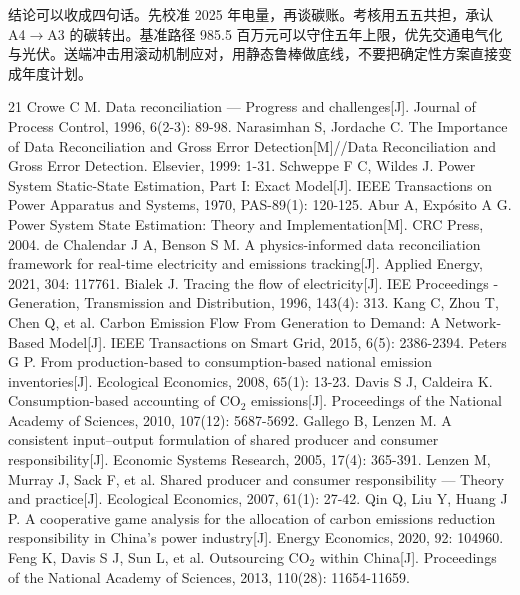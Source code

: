 \documentclass[UTF8,a4paper,zihao=-4,fontset=fandol]{ctexart}
\begin{document}
结论可以收成四句话。先校准 2025 年电量，再谈碳账。考核用五五共担，承认 A4$\to$A3 的碳转出。基准路径 985.5 百万元可以守住五年上限，优先交通电气化与光伏。送端冲击用滚动机制应对，用静态鲁棒做底线，不要把确定性方案直接变成年度计划。

\begin{thebibliography}{21}
 Crowe C M. Data reconciliation — Progress and challenges[J]. Journal of Process Control, 1996, 6(2-3): 89-98.
 Narasimhan S, Jordache C. The Importance of Data Reconciliation and Gross Error Detection[M]//Data Reconciliation and Gross Error Detection. Elsevier, 1999: 1-31.
 Schweppe F C, Wildes J. Power System Static-State Estimation, Part I: Exact Model[J]. IEEE Transactions on Power Apparatus and Systems, 1970, PAS-89(1): 120-125.
 Abur A, Expósito A G. Power System State Estimation: Theory and Implementation[M]. CRC Press, 2004.
 de Chalendar J A, Benson S M. A physics-informed data reconciliation framework for real-time electricity and emissions tracking[J]. Applied Energy, 2021, 304: 117761.
 Bialek J. Tracing the flow of electricity[J]. IEE Proceedings - Generation, Transmission and Distribution, 1996, 143(4): 313.
 Kang C, Zhou T, Chen Q, et al. Carbon Emission Flow From Generation to Demand: A Network-Based Model[J]. IEEE Transactions on Smart Grid, 2015, 6(5): 2386-2394.
 Peters G P. From production-based to consumption-based national emission inventories[J]. Ecological Economics, 2008, 65(1): 13-23.
 Davis S J, Caldeira K. Consumption-based accounting of CO$_2$ emissions[J]. Proceedings of the National Academy of Sciences, 2010, 107(12): 5687-5692.
 Gallego B, Lenzen M. A consistent input--output formulation of shared producer and consumer responsibility[J]. Economic Systems Research, 2005, 17(4): 365-391.
 Lenzen M, Murray J, Sack F, et al. Shared producer and consumer responsibility — Theory and practice[J]. Ecological Economics, 2007, 61(1): 27-42.
 Qin Q, Liu Y, Huang J P. A cooperative game analysis for the allocation of carbon emissions reduction responsibility in China's power industry[J]. Energy Economics, 2020, 92: 104960.
 Feng K, Davis S J, Sun L, et al. Outsourcing CO$_2$ within China[J]. Proceedings of the National Academy of Sciences, 2013, 110(28): 11654-11659.

\end{thebibliography}
\end{document}
